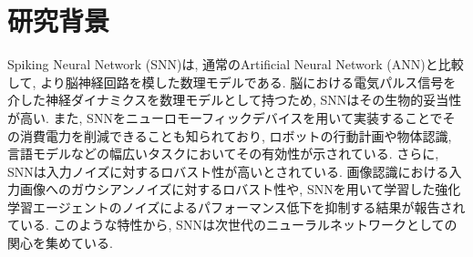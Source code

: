 \section{研究背景}
Spiking Neural Network (SNN)は, 通常のArtificial Neural Network (ANN)と比較して, より脳神経回路を模した数理モデルである.
脳における電気パルス信号を介した神経ダイナミクスを数理モデルとして持つため, SNNはその生物的妥当性が高い.
また, SNNをニューロモーフィックデバイスを用いて実装することでその消費電力を削減できることも知られており, ロボットの行動計画や物体認識, 言語モデルなどの幅広いタスクにおいてその有効性が示されている\cite{yamazaki2022spiking, snnyolo, s23063037}.
さらに, SNNは入力ノイズに対するロバスト性が高いとされている.
画像認識における入力画像へのガウシアンノイズに対するロバスト性\cite{zhao2022spiking}や, SNNを用いて学習した強化学習エージェントのノイズによるパフォーマンス低下を抑制する結果が報告されている\cite{patel2019improved}.
このような特性から, SNNは次世代のニューラルネットワークとしての関心を集めている\cite{maass1997networks}.

